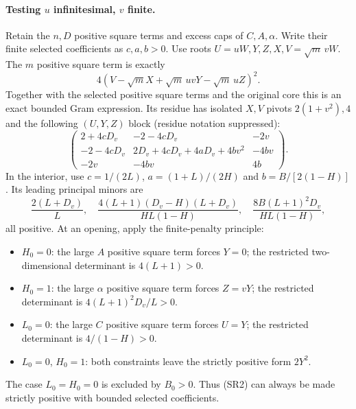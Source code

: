 \paragraph{Testing $u$ infinitesimal, $v$ finite.}
Retain the $n,D$ positive square terms and excess caps of $C,A,\alpha$.
Write their finite selected coefficients as $c,a,b>0$. Use roots
$U=uW,Y,Z,X,V=\sqrt m\,vW$. The $m$ positive square term is exactly
\[
 4(V-\sqrt m X+\sqrt m\,uvY-\sqrt m\,uZ)^2.
\]
Together with the selected positive square terms and the original core this is an
exact bounded Gram expression. Its residue has isolated $X,V$ pivots
$2(1+v^2),4$ and the following $(U,Y,Z)$ block (residue notation suppressed):
\[
 \begin{pmatrix}
 2+4cD_v&-2-4cD_v&-2v\\
 -2-4cD_v&2D_v+4cD_v+4aD_v+4bv^2&-4bv\\
 -2v&-4bv&4b
 \end{pmatrix}.
\tag{SR2}
\]
In the interior, use $c=1/(2L)$, $a=(1+L)/(2H)$ and
$b=B/[2(1-H)]$. Its leading principal minors are
\[
 \frac{2(L+D_v)}L,\quad
 \frac{4(L+1)(D_v-H)(L+D_v)}{HL(1-H)},\quad
 \frac{8B(L+1)^2D_v}{HL(1-H)},
\tag{SR3}
\]
all positive. At an opening, apply the finite-penalty principle:
\begin{itemize}
\item $H_0=0$: the large $A$ positive square term forces $Y=0$; the restricted
      two-dimensional determinant is $4(L+1)>0$.
\item $H_0=1$: the large $\alpha$ positive square term forces $Z=vY$; the restricted
      determinant is $4(L+1)^2D_v/L>0$.
\item $L_0=0$: the large $C$ positive square term forces $U=Y$; the restricted
      determinant is $4/(1-H)>0$.
\item $L_0=0$, $H_0=1$: both constraints leave the strictly positive
      form $2Y^2$.
\end{itemize}
The case $L_0=H_0=0$ is excluded by $B_0>0$. Thus (SR2) can always be
made strictly positive with bounded selected coefficients.

